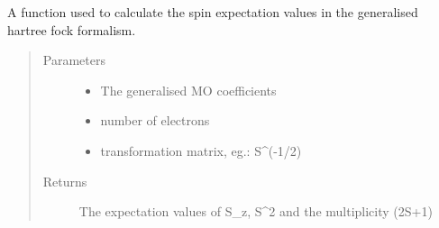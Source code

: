 \documentclass[letterpaper,10pt,english]{sphinxmanual}
\begin{document}
\begin{fulllineitems}
\label{\detokenize{spin:hf.utilities.spin.ghf}}
A function used to calculate the spin expectation values in the generalised hartree fock formalism.
\begin{quote}\begin{description}
\item[{Parameters}] \leavevmode\begin{itemize}
\item {} 
 \textendash{} The generalised MO coefficients

\item {} 
 \textendash{} number of electrons

\item {} 
 \textendash{} transformation matrix, eg.: S\textasciicircum{}(-1/2)

\end{itemize}

\item[{Returns}] \leavevmode
The expectation values of S\_z, S\textasciicircum{}2 and the multiplicity (2S+1)

\end{description}\end{quote}

\end{fulllineitems}

\end{document}
